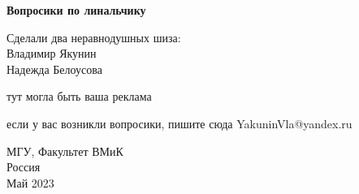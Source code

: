 \begin{titlepage}
    \begin{center}
  
       \vspace*{1cm}
        \huge
       \textbf{Вопросики по линальчику}
        \normalsize

  
            
       \vspace{1.5cm}

       \begin{flushright}
       Сделали два неравнодушных шиза:\\
       Владимир Якунин \\
       Надежда Белоусова\\
       \end{flushright}

       \vfill
            тут могла быть ваша реклама
       \vfill
     
        если у вас возникли вопросики, пишите сюда YakuninVla@yandex.ru
        
       МГУ, Факультет ВМиК\\
       Россия\\
       Май 2023
    \end{center}
\end{titlepage}